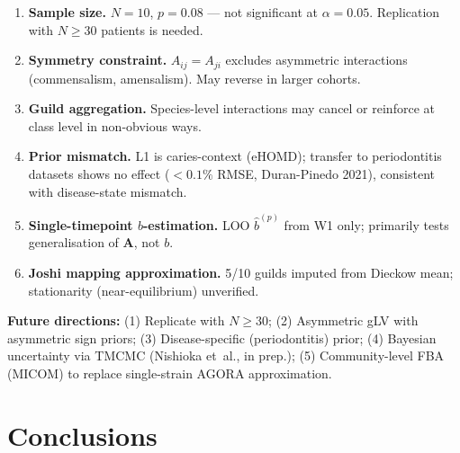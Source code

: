 \documentclass[10pt,a4paper]{article}
\newcommand{\bA}{\mathbf{A}}
\begin{document}
\begin{limitbox}[Limitations]
\begin{enumerate}[noitemsep]
  \item \textbf{Sample size.} $N=10$, $p=0.08$ --- not significant at $\alpha=0.05$.
        Replication with $N\geq30$ patients is needed.
  \item \textbf{Symmetry constraint.} $A_{ij}=A_{ji}$ excludes asymmetric interactions
        (commensalism, amensalism). May reverse in larger cohorts.
  \item \textbf{Guild aggregation.} Species-level interactions may cancel or reinforce
        at class level in non-obvious ways.
  \item \textbf{Prior mismatch.} L1 is caries-context (eHOMD); transfer to periodontitis
        datasets shows no effect ($<0.1\%$ RMSE, Duran-Pinedo 2021), consistent with disease-state mismatch.
  \item \textbf{Single-timepoint $b$-estimation.} LOO $\hat b^{(p)}$ from W1 only;
        primarily tests generalisation of $\bA$, not $b$.
  \item \textbf{Joshi mapping approximation.} 5/10 guilds imputed from Dieckow mean;
        stationarity (near-equilibrium) unverified.
\end{enumerate}
\end{limitbox}

\textbf{Future directions:}
(1) Replicate with $N\geq30$;
(2) Asymmetric gLV with asymmetric sign priors;
(3) Disease-specific (periodontitis) prior;
(4) Bayesian uncertainty via TMCMC (Nishioka et~al., in prep.);
(5) Community-level FBA (MICOM) to replace single-strain AGORA approximation.

\section{Conclusions}
\end{document}
